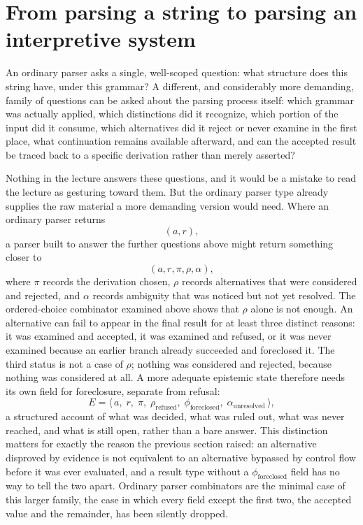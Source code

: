 \documentclass[11pt]{article}
\begin{document}
\section{From parsing a string to parsing an interpretive system}

An ordinary parser asks a single, well-scoped question: what structure does this string have, under this grammar? A different, and considerably more demanding, family of questions can be asked about the parsing process itself: which grammar was actually applied, which distinctions did it recognize, which portion of the input did it consume, which alternatives did it reject or never examine in the first place, what continuation remains available afterward, and can the accepted result be traced back to a specific derivation rather than merely asserted?

Nothing in the lecture answers these questions, and it would be a mistake to read the lecture as gesturing toward them. But the ordinary parser type already supplies the raw material a more demanding version would need. Where an ordinary parser returns
\[
(a, r),
\]
a parser built to answer the further questions above might return something closer to
\[
(a, r, \pi, \rho, \alpha),
\]
where $\pi$ records the derivation chosen, $\rho$ records alternatives that were considered and rejected, and $\alpha$ records ambiguity that was noticed but not yet resolved. The ordered-choice combinator examined above shows that $\rho$ alone is not enough. An alternative can fail to appear in the final result for at least three distinct reasons: it was examined and accepted, it was examined and refused, or it was never examined because an earlier branch already succeeded and foreclosed it. The third status is not a case of $\rho$; nothing was considered and rejected, because nothing was considered at all. A more adequate epistemic state therefore needs its own field for foreclosure, separate from refusal:
\[
E = \langle\, a,\; r,\; \pi,\; \rho_{\text{refused}},\; \phi_{\text{foreclosed}},\; \alpha_{\text{unresolved}} \,\rangle,
\]
a structured account of what was decided, what was ruled out, what was never reached, and what is still open, rather than a bare answer. This distinction matters for exactly the reason the previous section raised: an alternative disproved by evidence is not equivalent to an alternative bypassed by control flow before it was ever evaluated, and a result type without a $\phi_{\text{foreclosed}}$ field has no way to tell the two apart. Ordinary parser combinators are the minimal case of this larger family, the case in which every field except the first two, the accepted value and the remainder, has been silently dropped.
\end{document}
